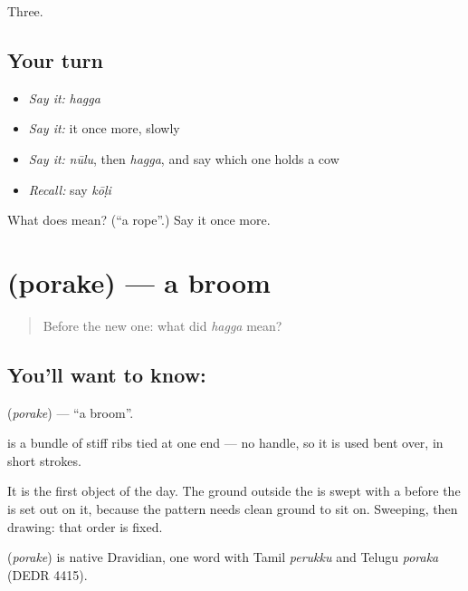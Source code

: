 \begin{grammarlens}[title={What you've built}]
Three.
\end{grammarlens}

\subsection*{Your turn}
\begin{itemize}
\raggedright
  \item \emph{Say it:} \emph{hagga}
  \item \emph{Say it:} it once more, slowly
  \item \emph{Say it:} \emph{nūlu}, then \emph{hagga}, and say which one holds a cow
  \item \emph{Recall:} say \emph{kōḷi}
\end{itemize}

\begin{tcolorbox}[breakable,colback=teal!4,colframe=teal!35!black,title={Before you move on}]
What does  mean? (\textquotedblleft{}a rope\textquotedblright{}.) Say it once more.
\end{tcolorbox}
\section[\texorpdfstring{\kn{ಪೊರಕೆ} (porake)}{ಪೊರಕೆ (porake)}]{ (porake) — a broom}

\label{lesson:KA-C62-broom}



\begin{quote}
Before the new one: what did \emph{hagga} mean?
\end{quote}

\subsection*{You'll want to know: }
\textbf{} (\emph{porake}) — \textquotedblleft{}a broom\textquotedblright{}.

 is a bundle of stiff ribs tied at one end — no handle, so it is used bent over, in short strokes.

It is the first object of the day. The ground outside the  is swept with a  before the  is set out on it, because the pattern needs clean ground to sit on. Sweeping, then drawing: that order is fixed.

\begin{cousinweb}
\textbf{} (\emph{porake}) is native Dravidian, one word with Tamil \emph{perukku} and Telugu \emph{poraka} (DEDR 4415).
\end{cousinweb}

